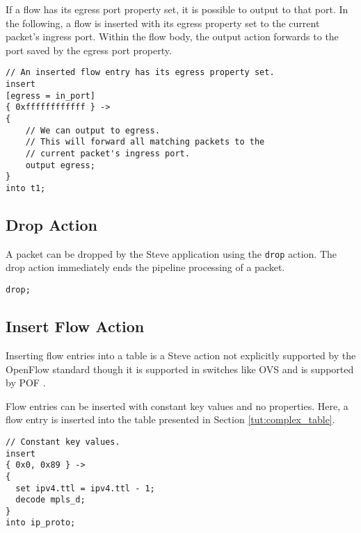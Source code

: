 If a flow has its egress port property set, it is possible to output to that
port. In the following, a flow is inserted with its egress property set to the
current packet's ingress port. Within the flow body, the output action forwards
to the port saved by the egress port property.

\begin{codepage}
\begin{lstlisting}
// An inserted flow entry has its egress property set.
insert
[egress = in_port]
{ 0xffffffffffff } ->
{
	// We can output to egress.
	// This will forward all matching packets to the
	// current packet's ingress port.
	output egress;
}
into t1;
\end{lstlisting}
\end{codepage}

\subsection{Drop Action} \label{tut:drop_action}

A packet can be dropped by the Steve application using the \texttt{drop} action.
The drop action immediately ends the pipeline processing of a packet.

\begin{codepage}
\begin{lstlisting}
drop;
\end{lstlisting}
\end{codepage}

\subsection{Insert Flow Action} \label{tut:insert_flow_action}

Inserting flow entries into a table is a Steve action not explicitly supported
by the OpenFlow standard \cite{openflow_spec} though it is supported in
switches like OVS \cite{ovs_man_page} and is supported by POF \cite{pof, pof_fis, pof_impl}.

Flow entries can be inserted with constant key values and no properties. Here,
a flow entry is inserted into the table presented in Section
\ref{tut:complex_table}.

\begin{codepage}
\begin{lstlisting}
// Constant key values.
insert
{ 0x0, 0x89 } ->
{
  set ipv4.ttl = ipv4.ttl - 1;
  decode mpls_d;
}
into ip_proto;
\end{lstlisting}
\end{codepage}

